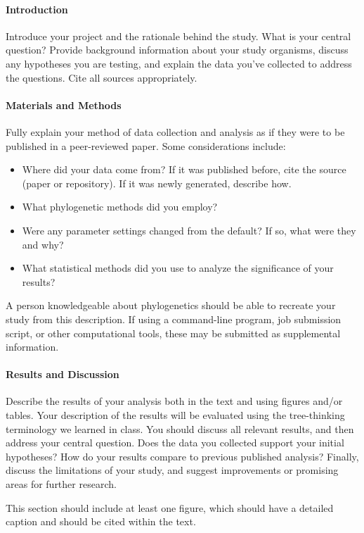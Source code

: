 \documentclass[12pt]{article}
\begin{document}
\paragraph{Introduction}
Introduce your project and the rationale behind the study. 
What is your central question?
Provide background information about your study organisms, discuss any hypotheses you are testing, and explain the data you've collected to address the questions.
Cite all sources appropriately.

\paragraph{Materials and Methods}
Fully explain your method of data collection and analysis as if they were to be published in a peer-reviewed paper.
Some considerations include:
\begin{itemize}
\item Where did your data come from? If it was published before, cite the source (paper or repository). If it was newly generated, describe how.
\item What phylogenetic methods did you employ? 
\item Were any parameter settings changed from the default? If so, what were they and why?
\item What statistical methods did you use to analyze the significance of your results?
\end{itemize}
A person knowledgeable about phylogenetics should be able to recreate your study from this description.
If using a command-line program, job submission script, or other computational tools, these may be submitted as supplemental information.


\paragraph{Results and Discussion}

Describe the results of your analysis both in the text and using figures and/or tables.
Your description of the results will be evaluated using the tree-thinking terminology we learned in class.
You should discuss all relevant results, and then address your central question.
Does the data you collected support your initial hypotheses?
How do your results compare to previous published analysis?
Finally, discuss the limitations of your study, and suggest improvements or promising areas for further research.

This section should include at least one figure, which should have a detailed caption and should be cited within the text.
\end{document}
